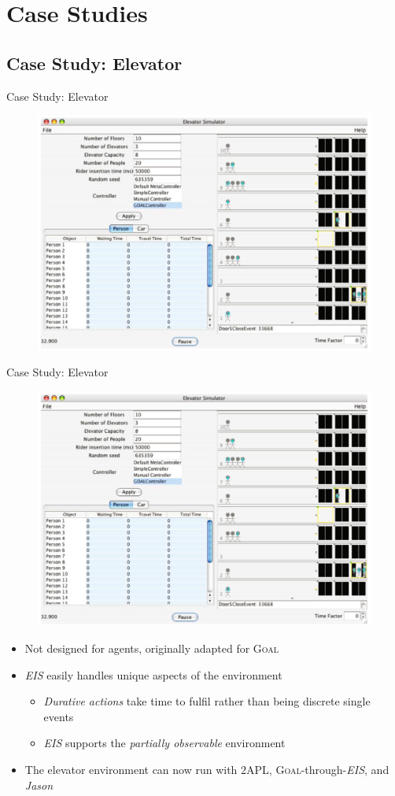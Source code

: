 \documentclass[t]{beamer}
\begin{document}
\section{Case Studies}
\subsection{Case Study: Elevator}
\begin{frame}{Case Study: Elevator}
	\begin{figure}
		\includegraphics[width=0.9\linewidth]{elevator}
	\end{figure}
\end{frame}
\begin{frame}[noframenumbering]{Case Study: Elevator}
	\begin{figure}
		\includegraphics[width=0.55\linewidth]{elevator}
	\end{figure}
	\begin{itemize}[<+->]
		\item Not designed for agents, originally adapted for \textsc{Goal}
		\item \emph{EIS} easily handles unique aspects of the environment
		\begin{itemize}
			\item \textit{Durative actions} take time to fulfil rather than being discrete single events
			\item \emph{EIS} supports the \textit{partially observable} environment
		\end{itemize}
		\item The elevator environment can now run with 2APL, \textsc{Goal}-through-\emph{EIS}, and \textit{Jason}
	\end{itemize}
\end{frame}
\end{document}

